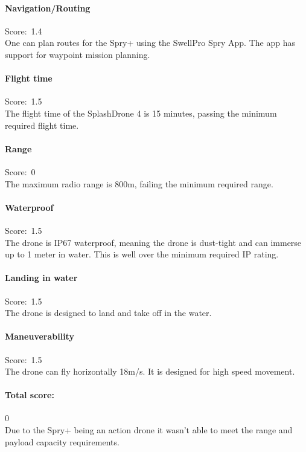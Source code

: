 \paragraph{Navigation/Routing}\mbox{Score: 1.4} \\
One can plan routes for the Spry+ using the SwellPro Spry App. The app has support for waypoint mission planning.

\paragraph{Flight time}\mbox{Score: 1.5} \\
The flight time of the SplashDrone 4 is 15 minutes, passing the minimum required flight time.

\paragraph{Range}\mbox{Score: 0} \\
The maximum radio range is 800m, failing the minimum required range.

\paragraph{Waterproof}\mbox{Score: 1.5} \\
The drone is IP67 waterproof, meaning the drone is dust-tight and can immerse up to 1 meter in water. This is well over the minimum required IP rating.

\paragraph{Landing in water}\mbox{Score: 1.5} \\
The drone is designed to land and take off in the water.

\paragraph{Maneuverability}\mbox{Score: 1.5} \\
The drone can fly horizontally 18m/s. It is designed for high speed movement.

\paragraph{Total score:}\mbox{0} \\
Due to the Spry+ being an action drone it wasn't able to meet the range and payload capacity requirements.

